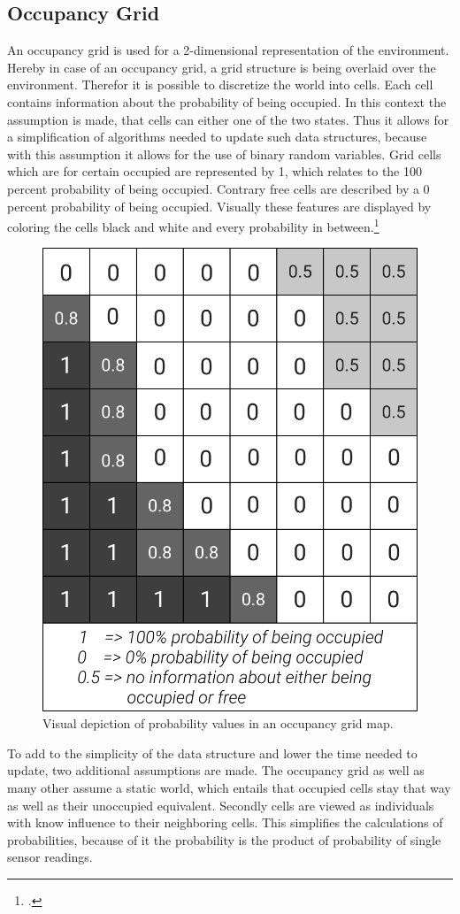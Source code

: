 \subsection{Occupancy Grid}
An occupancy grid is used for a 2-dimensional representation of the environment. Hereby in case of an occupancy grid, a grid structure is being overlaid over the environment. Therefor it is possible to discretize the world into cells. Each cell contains information about the probability of being occupied. In this context the assumption is made, that cells can either one of the two states. Thus it allows for a simplification of algorithms needed to update such data structures, because with this assumption it allows for the use of binary random variables. Grid cells which are for certain occupied are represented by 1, which relates to the 100 percent probability of being occupied. Contrary free cells are described by a 0 percent probability of being occupied. Visually these features are displayed by coloring the cells black and white and every probability in between.\footcite{OccupancyGridMaps2020}

\begin{figure}[h]
	\centering
	\includegraphics[width=0.5\linewidth]{img/OccupancyGridCells}
	\caption{Visual depiction of probability values in an occupancy grid map.}
	\label{fig:abstract_environments_occupancyCells}
\end{figure}

To add to the simplicity of the data structure and lower the time needed to update, two additional assumptions are made. The occupancy grid as well as many other assume a static world, which entails that occupied cells stay that way as well as their unoccupied equivalent. Secondly cells are viewed as individuals with know influence to their neighboring cells. This simplifies the calculations of probabilities, because of it the probability is the product of probability of single sensor readings.     

